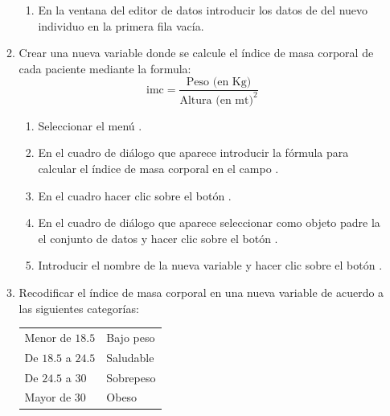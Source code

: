 \begin{enumerate}[leftmargin=*]
\begin{enumerate}
\begin{indicacion}
\begin{enumerate}
\item En la ventana del editor de datos introducir los datos de del nuevo individuo en la primera fila vacía.
\end{enumerate}
\end{indicacion}

\item Crear una nueva variable donde se calcule el índice de masa corporal de cada paciente mediante la formula:
\[
\text{imc} = \frac{\text{Peso (en Kg)}}{\text{Altura (en mt)}^2}
\]

\begin{indicacion}
\begin{enumerate}
\item Seleccionar el menú .
\item En el cuadro de diálogo que aparece introducir la fórmula para calcular el índice de masa
corporal en el campo .
\item En el cuadro  hacer clic sobre el botón .
\item En el cuadro de diálogo que aparece seleccionar como objeto padre la el conjunto de datos  y hacer clic sobre el botón .
\item Introducir el nombre de la nueva variable  y hacer clic sobre el botón .
\end{enumerate}
\end{indicacion}

\item Recodificar el índice de masa corporal en una nueva variable de acuerdo a las siguientes categorías:
\begin{center}
\begin{tabular}{ll}
Menor de $18.5$ & Bajo peso\\
De $18.5$ a $24.5$ & Saludable\\
De $24.5$ a $30$ & Sobrepeso\\
Mayor de $30$  & Obeso
\end{tabular}
\end{center}


\end{enumerate}
\end{enumerate}
